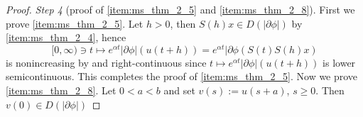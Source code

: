 \documentclass[a4paper,11pt, leqno]{scrreprt} %
\renewcommand{\geq}{\geqslant}
\theoremstyle{change}
\theoremstyle{nonumberplain}
\newtheorem{proof}{Proof}
\begin{document}
\begin{proof}
  \textit{Step 4} (proof of \ref{item:ms_thm_2_5} and
  \ref{item:ms_thm_2_8}). First we prove \ref{item:ms_thm_2_5}. Let $h
  > 0$, then $S(h)x \in D(|\partial \phi|)$ by \ref{item:ms_thm_2_4},
  hence
  \begin{equation}
    \label{eq:ms_thm_2_38}
    [0, \infty) \ni t \mapsto e^{\alpha t} |\partial \phi|(u(t + h)) =
    e^{\alpha t} |\partial \phi(S(t)S(h)x)
  \end{equation}
  is nonincreasing by  and right-continuous since $t
  \mapsto e^{\alpha t} |\partial \phi|(u(t + h))$ is lower
  semicontinuous. This completes the proof of
  \ref{item:ms_thm_2_5}. Now we prove \ref{item:ms_thm_2_8}. Let $0 <
  a < b$ and set $v(s) := u(s + a)$, $s \geq 0$. Then $v(0) \in
  D(|\partial \phi|)$ 
\end{proof}
\end{document}
